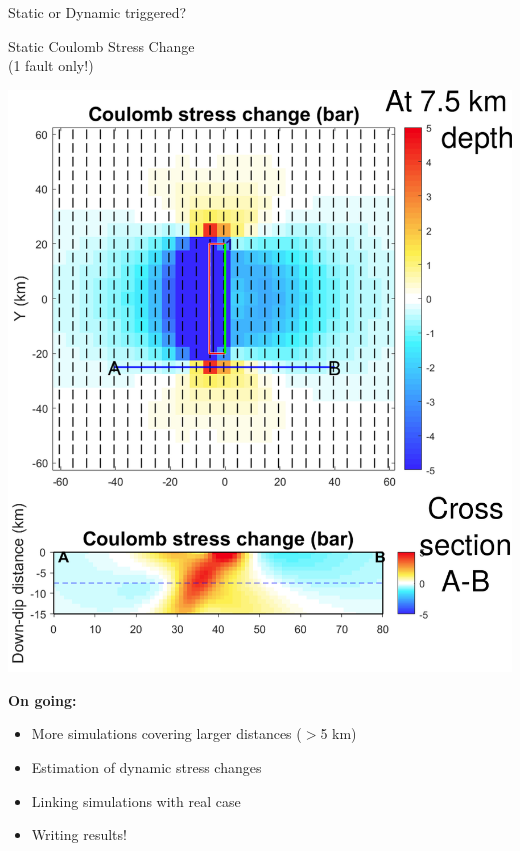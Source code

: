 \documentclass{beamer}
\begin{document}
\begin{frame}
 {Static or Dynamic triggered?}
 
 
 \begin{minipage}{0.45\linewidth}
 \begin{center}
  {\large Static Coulomb Stress Change} \\ 
  (1 fault only!)
 \end{center}
  \includegraphics[width=1\linewidth]{images/CSC.png}
 \end{minipage}
 \begin{minipage}{0.45\linewidth}
 {\bf On going:}
  \begin{itemize}
   \item More simulations covering larger distances ($>$5 km)
   \\
   \item Estimation of dynamic stress changes
   \\
   \item Linking simulations with real case
   \\
   \item Writing results!
  \end{itemize}
 \end{minipage}

 
\end{frame}
\end{document}
